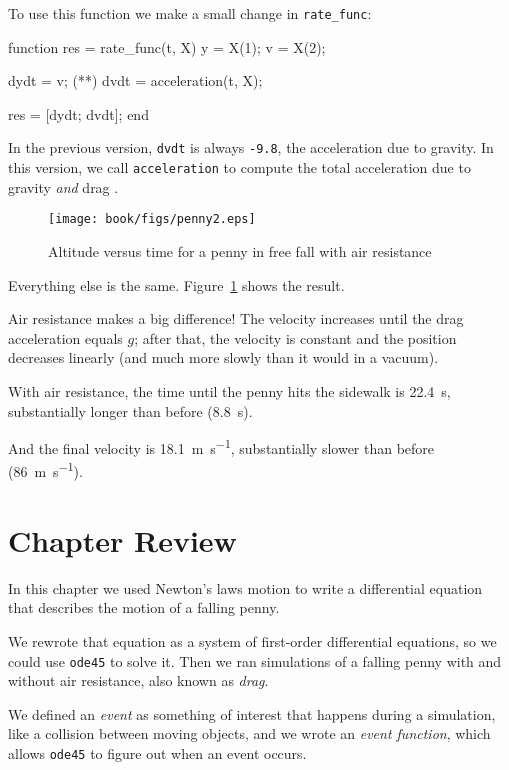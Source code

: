 To use this function we make a small change in \lstinline{rate_func}:

\begin{code}
function res = rate_func(t, X)
    y = X(1);      
    v = X(2);      
    
    dydt = v;
(**)    dvdt = acceleration(t, X);   %

    res = [dydt; dvdt];
end

\end{code}

In the previous version, \lstinline{dvdt} is always \lstinline{-9.8}, the acceleration due to gravity.
In this version, we call \lstinline{acceleration} to compute the total acceleration due to gravity {\em and} drag .

\begin{figure}[ht]
\centerline{\texttt{[image: book/figs/penny2.eps]}}
\caption{Altitude versus time for a penny in free fall with air resistance}
\label{fig:penny2}
\end{figure}

Everything else is the same.  Figure~\ref{fig:penny2} shows the result. 

Air resistance makes a big difference!  The velocity increases until
the drag acceleration equals $g$; after that, the velocity is constant and the position decreases linearly (and much more slowly than it would in a vacuum).

With air resistance, the time until the penny hits the sidewalk is \SI{22.4}{\second}, substantially longer than before (\SI{8.8}{\second}).

And the final velocity is \SI{18.1}{\meter \per \second}, substantially slower than before (\SI{86}{\meter \per \second}).

\section{Chapter Review}

In this chapter we used Newton's laws motion to write a differential equation that describes the motion of a falling penny.  

We rewrote that equation as a system of first-order differential equations, so we could use \lstinline{ode45} to solve it.  Then we ran simulations of a falling penny with and without air resistance, also known as {\em drag}.

We defined an {\em event} as something of interest that happens during a simulation, like a collision between moving objects, and we wrote an {\em event function}, which allows \lstinline{ode45} to figure out when an event occurs.

